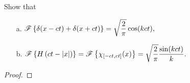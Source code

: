\begin{problem}{2.2}
  Show that
  \begin{enumerate}
    \item [a.] $\displaystyle \mathscr{F}\left\{ { \delta(x - ct) + \delta(x + ct) } \right\} = \sqrt{ \frac{ 2 }{ \pi} } \cos(kct),$
    \item [b.] $\displaystyle \mathscr{F}\left\{ { H \left( ct - |x| \right) } \right\} = \mathscr{F}\left\{ { \chi_{[-ct, ct]}(x) } \right\}
      = \sqrt{ \frac{ 2 }{ \pi} } \frac{ \sin(kct) }{ k }.$
  \end{enumerate}
\end{problem}

\begin{proof}
\end{proof}
\newpage
